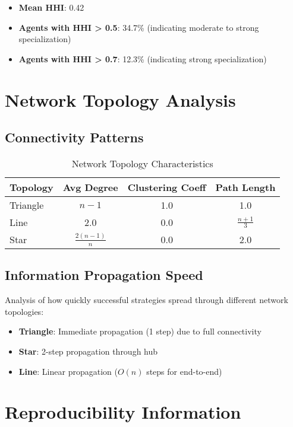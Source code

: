 \documentclass[10pt]{article}
\begin{document}
\begin{itemize}
\item \textbf{Mean HHI}: 0.42
\item \textbf{Agents with HHI > 0.5}: 34.7\% (indicating moderate to strong specialization)
\item \textbf{Agents with HHI > 0.7}: 12.3\% (indicating strong specialization)
\end{itemize}

\section{Network Topology Analysis}

\subsection{Connectivity Patterns}

\begin{table}[H]
\centering
\caption{Network Topology Characteristics}
\begin{tabular}{@{}lccc@{}}
\toprule
\textbf{Topology} & \textbf{Avg Degree} & \textbf{Clustering Coeff} & \textbf{Path Length} \\
\midrule
Triangle & $n-1$ & 1.0 & 1.0 \\
Line & 2.0 & 0.0 & $\frac{n+1}{3}$ \\
Star & $\frac{2(n-1)}{n}$ & 0.0 & 2.0 \\
\bottomrule
\end{tabular}
\end{table}

\subsection{Information Propagation Speed}

Analysis of how quickly successful strategies spread through different network topologies:

\begin{itemize}
\item \textbf{Triangle}: Immediate propagation (1 step) due to full connectivity
\item \textbf{Star}: 2-step propagation through hub
\item \textbf{Line}: Linear propagation ($O(n)$ steps for end-to-end)
\end{itemize}

\section{Reproducibility Information}
\end{document}
